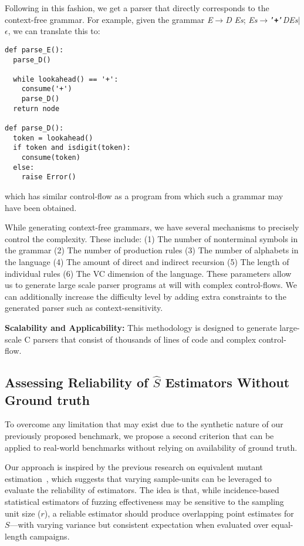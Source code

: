 \documentclass[conference]{IEEEtran}
\def\term#1{\texttt{'\textbf{#1}'}}
\def\nonterm#1{\textlangle\textnormal{\emph{#1}}\textrangle}
\def\expandsto{\(\rightarrow{}\)}
\begin{document}
Following in this fashion, we get a parser that directly corresponds to the context-free
grammar. For example, given the grammar 
\nonterm{E}\expandsto \nonterm{D} \nonterm{Es};
\nonterm{Es}\expandsto \term{+}\nonterm{D}\nonterm{Es}$|$ $\epsilon$, we can translate
this to:
\begin{lstlisting}[style=Python, escapechar=|,numbersep=2pt]
def parse_E():
  parse_D()

  while lookahead() == '+':
    consume('+')
    parse_D()
  return node

def parse_D():
  token = lookahead()
  if token and isdigit(token):
    consume(token)
  else:
    raise Error()
\end{lstlisting}
which has similar control-flow as a program from which such a grammar may have
been obtained.

While generating context-free grammars, we have several mechanisms to
precisely control the complexity. These include:
(1) The number of nonterminal symbols in the grammar
(2) The number of production rules
(3) The number of alphabets in the language
(4) The amount of direct and indirect recursion
(5) The length of individual rules
(6) The VC dimension of the language.
These parameters allow us to generate large scale parser programs at will with
complex control-flows. We can additionally increase the difficulty level by
adding extra constraints to the generated parser such
as context-sensitivity.

\noindent\textbf{Scalability and Applicability:} This methodology is designed to generate large-scale C parsers that consist of thousands of lines of code and complex control-flow.

\subsection{Assessing Reliability of \texorpdfstring{$\hat{S}$}{S-hat} Estimators Without Ground truth}
To overcome any limitation that may exist due to the synthetic nature of our
previously proposed benchmark, we propose a second criterion that can be applied
to real-world benchmarks without relying on availability of ground truth.

Our approach is inspired by the previous research on equivalent mutant
estimation~\cite{Kuznetsov2024empirical}, which suggests that varying
sample-units can be leveraged to evaluate the reliability of estimators.
The idea is that, while incidence-based statistical estimators of
fuzzing effectiveness may be sensitive to the sampling unit size ($r$),
a reliable estimator should produce overlapping point estimates for $S$—with
varying variance but consistent expectation when evaluated over equal-length
campaigns.
\end{document}
